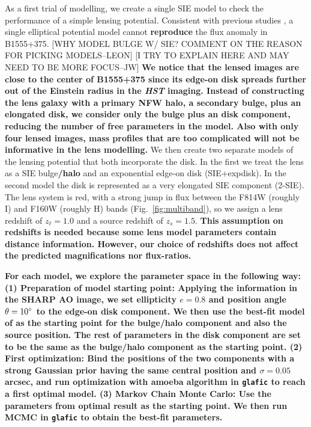 \documentclass[useAMS,usenatbib]{mn2e}
\begin{document}
As a first trial of modelling, we create a single SIE model to check
the performance of a simple lensing potential. Consistent with
previous studies \citep{Marlow99, Xu14}, a single elliptical
potential model cannot \textbf{reproduce} the flux anomaly in B1555+375.
[WHY MODEL BULGE W/ SIE? COMMENT ON THE REASON FOR PICKING MODELS--LEON]
[I TRY TO EXPLAIN HERE AND MAY NEED TO BE MORE FOCUS--JW]
\textbf{We notice that the lensed images are close to the center of B1555+375 since its edge-on disk spreads further out of the Einstein radius in the \textit{HST} imaging. Instead of constructing the lens galaxy with a primary NFW halo, a secondary bulge, plus an elongated disk, we consider only the bulge plus an disk component, reducing the number of free parameters in the model. Also with only four lensed images, mass profiles that are too complicated will not be informative in the lens modelling.}
We then create two separate models of the lensing potential that both
incorporate the disk.  In the first we treat the lens as a SIE bulge\textbf{/halo}
and an exponential edge-on disk (SIE+expdisk). In the second model
the disk is represented as a very elongated SIE component (2-SIE). 
The lens system is red, with a strong jump in flux between the F814W
(roughly I) and F160W (roughly H) bands (Fig.~\ref{fig:multiband}), so
we assign a lens redshift of $z_\ell = 1.0$ and a source redshift of
$z_s =1.5$. \textbf{This assumption on redshifts is needed because some lens model parameters contain distance information. However, our choice of redshifts does not affect the predicted magnifications nor flux-ratios.} 

\textbf{For each model, we explore the parameter space in the following way: 
(1) Preparation of model starting point: Applying the information in the SHARP AO image, we set ellipticity $e=0.8$ and position angle $\theta=10 \hbox{$^\circ$}$ to the edge-on disk component. We then use the best-fit model of \citet{Marlow99} as the starting point for the bulge\textbf{/halo} component and also the source position. The rest of parameters in the disk component are set to be the same as the bulge/halo component as the starting point.
(2) First optimization: Bind the positions of the two components with a strong Gaussian prior having the same central position and $\sigma = 0.05 $ arcsec, and run optimization with amoeba algorithm in {\tt glafic} to reach a first optimal model.
(3) Markov Chain Monte Carlo: Use the parameters from optimal result as the starting point. We then run MCMC in {\tt glafic} to obtain the best-fit parameters.} 
\end{document}
